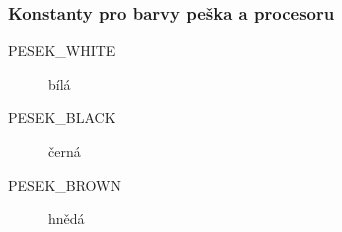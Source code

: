 \documentclass[12pt]{article}
\begin{document}

\subsubsection{Konstanty pro barvy peška a procesoru}
\begin{description}
\item[PESEK\_WHITE] bílá
\item[PESEK\_BLACK] černá
\item[PESEK\_BROWN] hnědá
\end{description}

\end{document}
